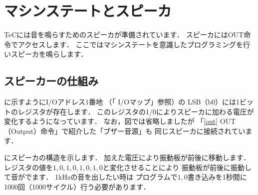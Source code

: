 %

\newpage
\section{マシンステートとスピーカ}

TeCには音を鳴らすためのスピーカが準備されています．
スピーカにはOUT命令でアクセスします．
ここではマシンステートを意識したプログラミングを行いスピーカを鳴らします．

\subsection{スピーカーの仕組み}
に示すようにI/Oアドレス1番地
（「 I/Oマップ」参照）の
LSB（b0）には1ビットのレジスタが存在します．
このレジスタの1/0によりスピーカに加わる電圧が変化するようになっています．
なお，図では省略しましたが
「\ref{out} OUT（Output）命令」で紹介した「ブザー音源」も
同じスピーカに接続されています．


にスピーカの構造を示します．
加えた電圧により振動板が前後に移動します．
レジスタの値を$1,0,1,0,1,0,1,0$と変化させることにより
振動板が前後に振動して音がでます．
1kHzの音を出したい時は
プログラムで$1,0$書き込みを1秒間に1000回（1000サイクル）行う必要があります．


